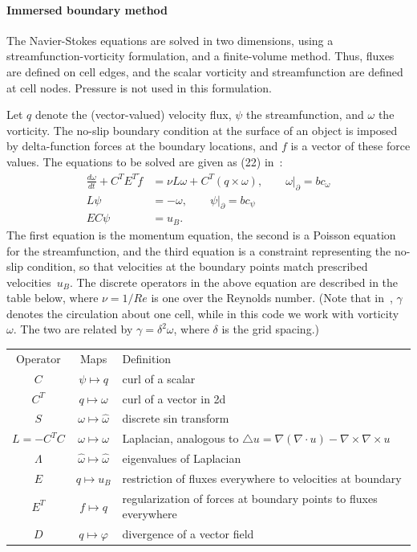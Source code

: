 \documentclass[11pt]{article}
\begin{document}
\paragraph{Immersed boundary method}
The Navier-Stokes equations are solved in two dimensions, using a streamfunction-vorticity formulation, and a finite-volume method.  Thus, fluxes are defined on cell edges, and the scalar vorticity and streamfunction are defined at cell nodes.  Pressure is not used in this formulation.

Let $q$ denote the (vector-valued) velocity flux, $\psi$ the streamfunction, and $\omega$ the vorticity.  The no-slip boundary condition at the surface of an object is imposed by delta-function forces at the boundary locations, and $f$ is a vector of these force values.  The equations to be solved are given as (22) in~\cite{ColTai-07}:
\begin{align}
	\frac{d\omega}{dt} + C^TE^T\tilde f &= \nu L\omega + C^T(q\times\omega),
		\qquad \omega\big|_\partial = bc_\omega
		\label{eq:navier_stokes}\\
	L\psi &= -\omega,\qquad \psi\big|_\partial = bc_\psi
		\label{eq:poisson}\\
	EC\psi &= u_B.
		\label{eq:no_slip}
\end{align}
The first equation is the momentum equation, the second is a Poisson equation for the streamfunction, and the third equation is a constraint representing the no-slip condition, so that velocities at the boundary points match prescribed velocities~$u_B$. The discrete operators in the above equation are described in the table below, where $\nu=1/Re$ is one over the Reynolds number.  (Note that in~\cite{ColTai-07}, $\gamma$ denotes the circulation about one cell, while in this code we work with vorticity~$\omega$.  The two are related by $\gamma = \delta^2\omega$, where $\delta$ is the grid spacing.)
\begin{center}
\begin{tabular}{ccp{3.7in}}
Operator & Maps & Definition\\
$C$ 	& $\psi\mapsto q$ & curl of a scalar\\
$C^T$ 	& $q\mapsto \omega$ & curl of a vector in 2d\\
$S$ 	& $\omega\mapsto\hat\omega$ & discrete sin transform\\
$L=-C^TC$	& $\omega\mapsto\omega$ & Laplacian, analogous to $\triangle u = \nabla(\nabla\cdot u) - \nabla\times\nabla\times u$\\
$\Lambda$	& $\hat\omega\mapsto\hat\omega$ & eigenvalues of Laplacian\\
$E$ 	& $q\mapsto u_B$ & restriction of fluxes everywhere to velocities at boundary\\
$E^T$	& $f\mapsto q$ & regularization of forces at boundary points to fluxes everywhere\\
$D$		& $q\mapsto \varphi$ & divergence of a vector field
\end{tabular}
\end{center}
\end{document}
